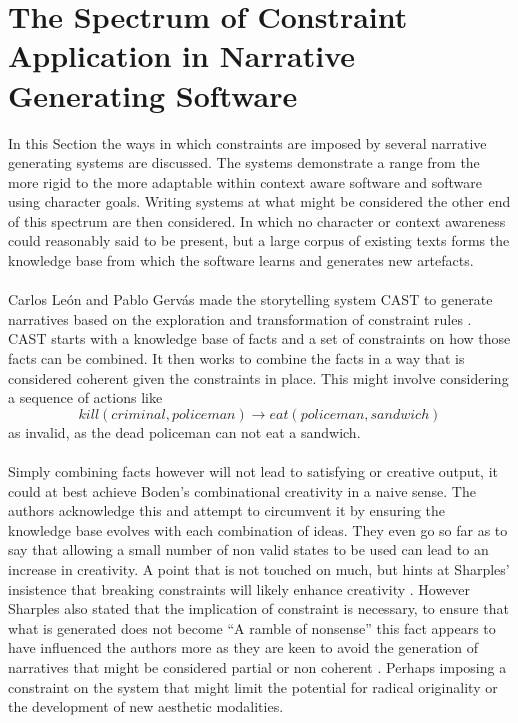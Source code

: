 \documentclass[letterpaper]{article}
\begin{document}
\section{The Spectrum of Constraint Application in Narrative Generating Software} \label{sec:spectrum}
In this Section the ways in which constraints are imposed by several narrative generating systems are discussed. The systems demonstrate a range from the more rigid to the more adaptable within context aware software and software using character goals. Writing systems at what might be considered the other end of this spectrum are then considered. In which no character or context awareness could reasonably said to be present, but a large corpus of existing texts forms the knowledge base from which the software learns and generates new artefacts.\\
\\Carlos Le\'on and Pablo Gerv\'as made the storytelling system CAST to generate narratives based on the exploration and transformation of constraint rules \cite{leon2008creative}. CAST starts with a knowledge base of facts and a set of constraints on how those facts can be combined. It then works to combine the facts in a way that is considered coherent given the constraints in place. This might involve considering a sequence of actions like\\
\begin{equation}
kill(criminal, policeman) \rightarrow eat(policeman, sandwich) 
\end{equation}
as invalid, as the dead policeman can not eat a sandwich. \\
\\Simply combining facts however will not lead to satisfying or creative output, it could at best achieve Boden's combinational creativity in a naive sense. The authors acknowledge this and attempt to circumvent it by ensuring the knowledge base evolves with each combination of ideas. They even go so far as to say that allowing a small number of non valid states to be used can lead to an increase in creativity. A point that is not touched on much, but hints at Sharples' insistence that breaking constraints will likely enhance creativity \cite{Sharples96anaccount}. However Sharples also stated that the implication of constraint is necessary, to ensure that what is generated does not become \enquote{A ramble of nonsense} this fact appears to have influenced the authors more as they are keen to avoid the generation of narratives that might be considered partial or non coherent \cite{leon2008creative}. Perhaps imposing a constraint on the system that might limit the potential for radical originality or the development of new aesthetic modalities.\\
\end{document}
